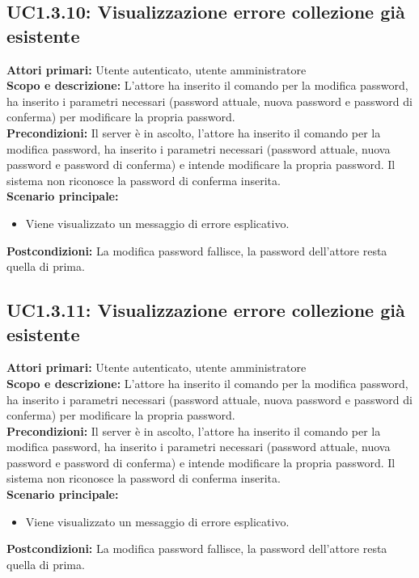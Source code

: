 \documentclass{scalatekids-article}
\begin{document}
\subsection{UC1.3.10: Visualizzazione errore collezione già esistente}

\textbf{Attori primari:} Utente autenticato, utente amministratore\\
\textbf{Scopo e descrizione:}
L'attore ha inserito il comando per la modifica password, ha inserito i parametri necessari (password attuale, nuova password e password di conferma) per modificare la propria password.\\
\textbf{Precondizioni:} Il server è in ascolto, l'attore ha inserito il comando per la modifica password, ha inserito i parametri necessari (password attuale, nuova password e password di conferma) e intende modificare la propria password. Il sistema non riconosce la password di conferma inserita.\\
\textbf{Scenario principale:}
\begin{itemize}
\item Viene visualizzato un messaggio di errore esplicativo.
\end{itemize}
\textbf{Postcondizioni:} La modifica password fallisce, la password dell'attore resta quella di prima.

\subsection{UC1.3.11: Visualizzazione errore collezione già esistente}

\textbf{Attori primari:} Utente autenticato, utente amministratore\\
\textbf{Scopo e descrizione:}
L'attore ha inserito il comando per la modifica password, ha inserito i parametri necessari (password attuale, nuova password e password di conferma) per modificare la propria password.\\
\textbf{Precondizioni:} Il server è in ascolto, l'attore ha inserito il comando per la modifica password, ha inserito i parametri necessari (password attuale, nuova password e password di conferma) e intende modificare la propria password. Il sistema non riconosce la password di conferma inserita.\\
\textbf{Scenario principale:}
\begin{itemize}
\item Viene visualizzato un messaggio di errore esplicativo.
\end{itemize}
\textbf{Postcondizioni:} La modifica password fallisce, la password dell'attore resta quella di prima.
\end{document}
